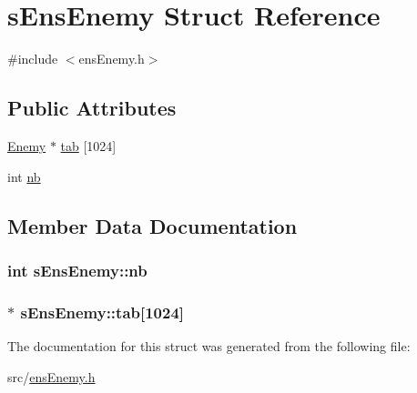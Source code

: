 \hypertarget{structs_ens_enemy}{}\section{s\+Ens\+Enemy Struct Reference}
\label{structs_ens_enemy}


{\ttfamily \#include $<$ens\+Enemy.\+h$>$}

\subsection*{Public Attributes}
\begin{DoxyCompactItemize}
\item 
\hyperlink{enemy_8h_ae3ac1c5e4d43de724487dfc83b509fd4}{Enemy} $\ast$ \hyperlink{structs_ens_enemy_ae686821bfd277f8c2bfd13cc00499656}{tab} \mbox{[}1024\mbox{]}
\item 
int \hyperlink{structs_ens_enemy_a21588de03e02330a540a0b7927f1a70b}{nb}
\end{DoxyCompactItemize}


\subsection{Member Data Documentation}
\hypertarget{structs_ens_enemy_a21588de03e02330a540a0b7927f1a70b}{}
\subsubsection[{nb}]{\setlength{\rightskip}{0pt plus 5cm}int s\+Ens\+Enemy\+::nb}\label{structs_ens_enemy_a21588de03e02330a540a0b7927f1a70b}
\hypertarget{structs_ens_enemy_ae686821bfd277f8c2bfd13cc00499656}{}
\subsubsection[{tab}]{$\ast$ s\+Ens\+Enemy\+::tab\mbox{[}1024\mbox{]}}\label{structs_ens_enemy_ae686821bfd277f8c2bfd13cc00499656}


The documentation for this struct was generated from the following file\+:\begin{DoxyCompactItemize}
\item 
src/\hyperlink{ens_enemy_8h}{ens\+Enemy.\+h}\end{DoxyCompactItemize}
